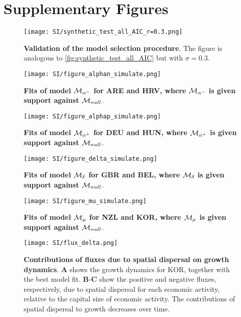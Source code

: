 
\graphicspath{{./content/chap4_econobiology/figures/}}

\clearpage
\section{Supplementary Figures}

\begin{figure}[ht]
  \center
  \texttt{[image: SI/synthetic\_test\_all\_AIC\_r=0.3.png]}
  \caption{\small \textbf{Validation of the model selection procedure}. The figure is analogous to \cref{fig:synthetic_test_all_AIC} but with $\sigma = 0.3$. 
   }\label{figSI:synthetic_test_all_AIC}
\end{figure}

\begin{figure}[ht]
  \center
  \texttt{[image: SI/figure\_alphan\_simulate.png]}
  \caption{\small \textbf{Fits of model $\mathcal{M}_{\alpha^-}$ for ARE and HRV, where $\mathcal{M}_{\alpha^-}$ is given support against $\mathcal{M}_{null}$}. 
   }\label{figSI:fit_alphan}
\end{figure}

\begin{figure}[ht]
  \center
  \texttt{[image: SI/figure\_alphap\_simulate.png]}
  \caption{\small \textbf{Fits of model $\mathcal{M}_{\alpha^+}$ for DEU and HUN, where $\mathcal{M}_{\alpha^+}$ is given support against $\mathcal{M}_{null}$}. 
   }\label{figSI:fit_alphap}
\end{figure}

\begin{figure}[ht]
  \center
  \texttt{[image: SI/figure\_delta\_simulate.png]}
  \caption{\small \textbf{Fits of model $\mathcal{M}_\delta$ for GBR and BEL, where $\mathcal{M}_\delta$ is given support against $\mathcal{M}_{null}$}. 
   }\label{figSI:fit_delta}
\end{figure}

\begin{figure}[ht]
  \center
  \texttt{[image: SI/figure\_mu\_simulate.png]}
  \caption{\small \textbf{Fits of model $\mathcal{M}_\mu$ for NZL and KOR, where $\mathcal{M}_\mu$ is given support against $\mathcal{M}_{null}$}. 
   }\label{figSI:fit_mu}
\end{figure}

\begin{figure}[ht]
  \center
  \texttt{[image: SI/flux\_delta.png]}
  \caption{\small \textbf{Contributions of fluxes due to spatial dispersal on growth dynamics}. \textbf{A} shows the growth dynamics for KOR, together with the best model fit. \textbf{B}-\textbf{C} show the positive and negative fluxes, respectively, due to spatial dispersal for each economic activity, relative to the capital size of economic activity. The contributions of spatial dispersal to growth decreases over time.
  }\label{figSI:flux_delta}
\end{figure}

